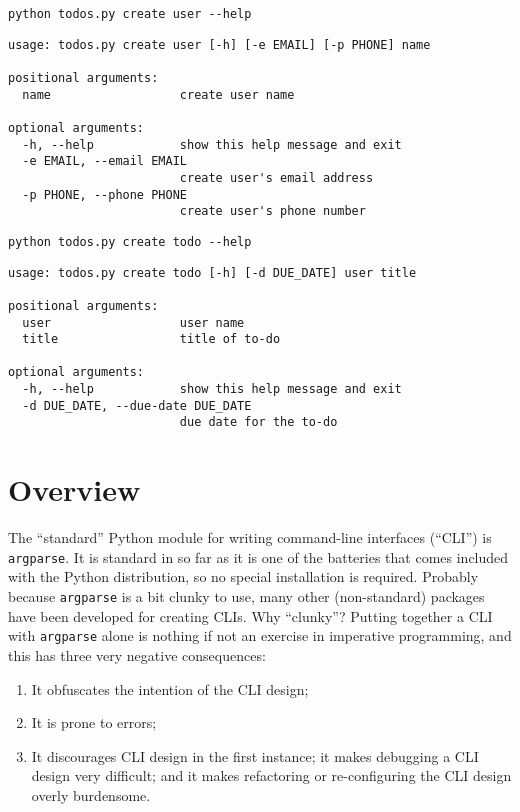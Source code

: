 \documentclass[10pt]{amsart}
\numberwithin{equation}{section}
\begin{document}
\begin{verbatim}
python todos.py create user --help
\end{verbatim}

\begin{verbatim}
usage: todos.py create user [-h] [-e EMAIL] [-p PHONE] name

positional arguments:
  name                  create user name

optional arguments:
  -h, --help            show this help message and exit
  -e EMAIL, --email EMAIL
                        create user's email address
  -p PHONE, --phone PHONE
                        create user's phone number
\end{verbatim}

\begin{verbatim}
python todos.py create todo --help
\end{verbatim}

\begin{verbatim}
usage: todos.py create todo [-h] [-d DUE_DATE] user title

positional arguments:
  user                  user name
  title                 title of to-do

optional arguments:
  -h, --help            show this help message and exit
  -d DUE_DATE, --due-date DUE_DATE
                        due date for the to-do
\end{verbatim}

\section{Overview}
\label{sec:org51eaf06}
The ``standard'' Python module for writing command-line interfaces (``CLI'') 
is \texttt{argparse}. It is standard in so far as it is one of the batteries 
that comes included with the Python distribution, so no special 
installation is required. 
Probably because \texttt{argparse} is a bit clunky to use,
many other (non-standard) packages have been developed for creating CLIs.
Why ``clunky''? Putting together a CLI with \texttt{argparse}
alone is nothing if not an exercise in imperative programming, and this
has three very negative consequences:

\begin{enumerate}
\item It obfuscates the intention of the CLI design;
\item It is prone to errors;
\item It discourages CLI design in the first instance; it
makes debugging a CLI design very difficult; and it makes refactoring or
re-configuring the CLI design overly burdensome.
\end{enumerate}
\end{document}
